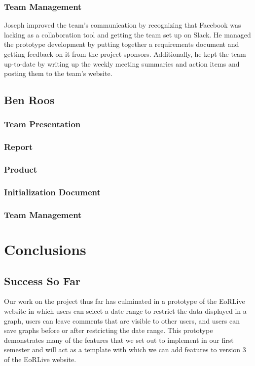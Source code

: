 \documentclass[12pt]{article}
\begin{document}
\begin{spacing}{1.5}
\subsubsection{Team Management}
Joseph improved the team's communication by recognizing that Facebook was lacking as a collaboration tool and getting the team set up on Slack. He managed the prototype development by putting together a requirements document and getting feedback on it from the project sponsors. Additionally, he kept the team up-to-date by writing up the weekly meeting summaries and action items and posting them to the team's website.

\clearpage

\subsection{Ben Roos}
\subsubsection{Team Presentation}
\subsubsection{Report}
\subsubsection{Product}
\subsubsection{Initialization Document}
\subsubsection{Team Management}

\clearpage

\section{Conclusions}
\subsection{Success So Far}
Our work on the project thus far has culminated in a prototype of the EoRLive website in which users can select a date range to restrict the data displayed in a graph, users can leave comments that are visible to other users, and users can save graphs before or after restricting the date range. This prototype demonstrates many of the features that we set out to implement in our first semester and will act as a template with which we can add features to version 3 of the EoRLive website.

\end{spacing}
\end{document}
